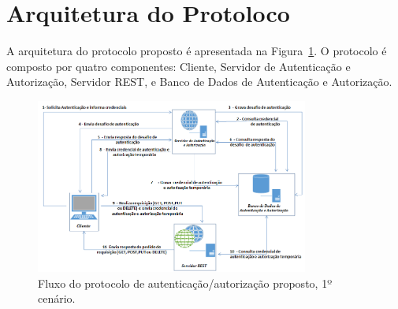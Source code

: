 
\section{Arquitetura do Protoloco}\label{sec:ArqProtocolo}

A arquitetura do protocolo proposto é apresentada na Figura~\ref{fig:arquiteturaprotocolo}. O protocolo é composto por quatro componentes: Cliente, Servidor de Autenticação e Autorização, Servidor REST, e Banco de Dados de Autenticação e Autorização.

\begin{figure}[!htb]
    \centering
    \includegraphics[width=0.8\textwidth]{arquitetura_protocolo.png}
    \caption{Fluxo do protocolo de autenticação/autorização proposto, 1º cenário.}
    \label{fig:arquiteturaprotocolo}
\end{figure}


